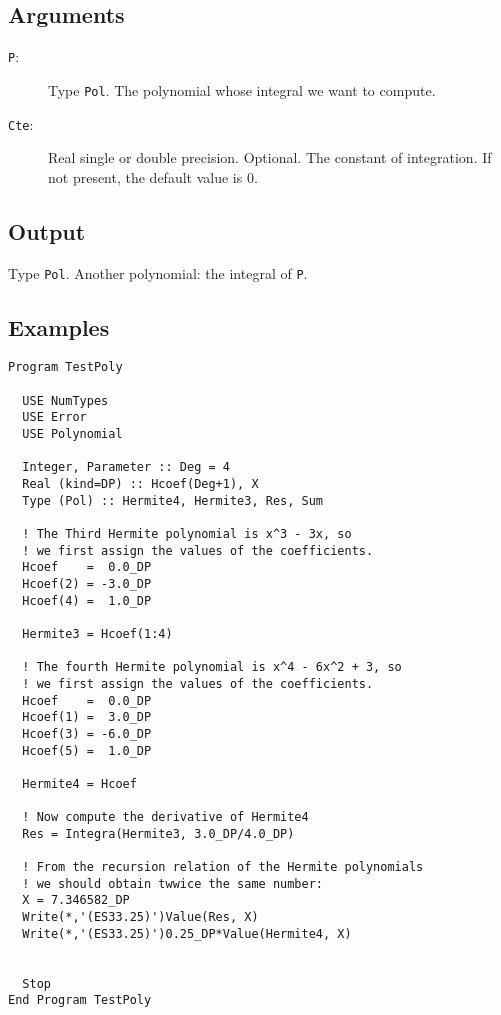 \subsection{Arguments}

\begin{description}
\item[\texttt{P}:] Type \texttt{Pol}. The polynomial whose integral
  we want to compute.
\item[\texttt{Cte}:] Real single or double precision. Optional. The
  constant of integration. If not present, the default value is 0.
\end{description}

\subsection{Output}

Type \texttt{Pol}. Another polynomial: the integral of \texttt{P}.

\subsection{Examples}

\begin{verbatim}
Program TestPoly

  USE NumTypes
  USE Error
  USE Polynomial

  Integer, Parameter :: Deg = 4
  Real (kind=DP) :: Hcoef(Deg+1), X
  Type (Pol) :: Hermite4, Hermite3, Res, Sum

  ! The Third Hermite polynomial is x^3 - 3x, so
  ! we first assign the values of the coefficients.
  Hcoef    =  0.0_DP
  Hcoef(2) = -3.0_DP
  Hcoef(4) =  1.0_DP

  Hermite3 = Hcoef(1:4)

  ! The fourth Hermite polynomial is x^4 - 6x^2 + 3, so
  ! we first assign the values of the coefficients.
  Hcoef    =  0.0_DP
  Hcoef(1) =  3.0_DP
  Hcoef(3) = -6.0_DP
  Hcoef(5) =  1.0_DP

  Hermite4 = Hcoef

  ! Now compute the derivative of Hermite4
  Res = Integra(Hermite3, 3.0_DP/4.0_DP)

  ! From the recursion relation of the Hermite polynomials 
  ! we should obtain twwice the same number:
  X = 7.346582_DP
  Write(*,'(ES33.25)')Value(Res, X)
  Write(*,'(ES33.25)')0.25_DP*Value(Hermite4, X)
  

  Stop
End Program TestPoly
\end{verbatim}

